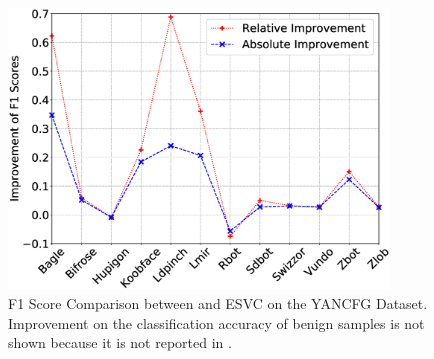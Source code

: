 \begin{figure}
    \centerline{\includegraphics[width=0.90\textwidth]{Magic/figures/YanAcfgF1Improve.eps}}
    \caption{F1 Score Comparison between \sysname and ESVC\cite{YanDataset} on the YANCFG Dataset.
    Improvement on the classification accuracy of benign samples is not shown because it is not reported in \cite{YanDataset}.}
    \label{MG:Fig:YANCFGF1Improve}
\end{figure}

